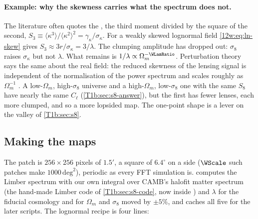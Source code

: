 \paragraph{Example: why the skewness carries what the spectrum does not.}
The literature often quotes the , the third moment divided by the square of the second,
$S_3\equiv\langle\kappa^3\rangle/\langle\kappa^2\rangle^2=\gamma_\kappa/\sigma_\kappa$. For a weakly skewed
lognormal field \eqref{12w:eq:ln-skew} gives $S_3\approx3r/\sigma_\kappa=3/\lambda$. The clumping amplitude has
dropped out: $\sigma_8$ raises $\sigma_\kappa$ but not $\lambda$. What remains is $1/\lambda\propto\Omega_m^{-\WLamRatio}$.
Perturbation theory says the same about the real field: the reduced skewness of the lensing signal is independent of
the normalisation of the power spectrum and scales roughly as $\Omega_m^{-1}$ .
A low-$\Omega_m$, high-$\sigma_8$ universe and a high-$\Omega_m$, low-$\sigma_8$ one with the same $S_8$ have
nearly the same $C_\ell$ (\cref{T1b:sec:s8-answer}), but the first has fewer lenses, each more clumped, and so a more
lopsided map. The one-point shape is a lever on the valley of \cref{T1b:sec:s8}.

\subsection{Making the maps}
\label{12w:sec:maps-code}

The patch is $256\times256$ pixels of $1.5'$, a square of $6.4^\circ$ on a side ($\WScale$ such patches make
$1000\,\mathrm{deg}^2$), periodic as every FFT simulation is.  computes the Limber
spectrum with our own integral over CAMB's halofit matter spectrum (the hand-made Limber code of
\cref{T1b:sec:s8-code}, now inside ) and $\lambda$ for the fiducial cosmology and for $\Omega_m$ and
$\sigma_8$ moved by $\pm5\%$, and caches all five for the later scripts. The lognormal recipe is four lines:


